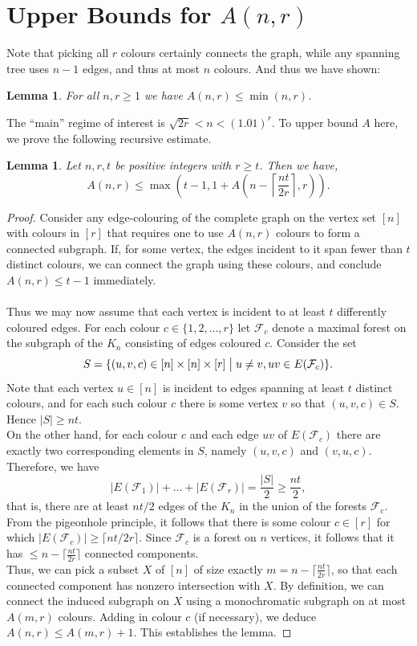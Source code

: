 \documentclass[11pt,a4paper]{article}
\newtheorem{lemma}[theorem]{Lemma}
\begin{document}
\section{Upper Bounds for \texorpdfstring{$A(n, r)$}{A(n, r)}}
Note that picking all $r$ colours certainly connects the graph, while any spanning tree uses $n-1$ edges, and thus at most $n$ colours. And thus we have shown:
\begin{lemma}
\label{lem:2:1}
For all $n, r \geq 1$ we have $A(n, r) \leq \min(n, r)$.
\end{lemma}
\noindent The ``main'' regime of interest is $\sqrt{2r} < n < (1.01)^r$. To upper bound $A$ here, we prove the following recursive estimate.
\begin{lemma}
\label{lem:2:2}
Let $n, r, t$ be positive integers with $r \geq t$. Then we have, \[A(n, r) \leq \max \left(t-1, 1 + A \left(n - \left\lceil\frac{nt}{2r}\right\rceil, r\right) \right). \]
\end{lemma}
\begin{proof}
Consider any edge-colouring of the complete graph on the vertex set $[n]$ with colours in $[r]$ that requires one to use $A(n, r)$ colours to form a connected subgraph.
If, for some vertex, the edges incident to it span fewer than $t$ distinct colours, we can connect the graph using these colours, and conclude $A(n, r) \leq t-1$ immediately. \\\\
Thus we may now assume that each vertex is incident to at least $t$ differently coloured edges. For each colour $c \in \{1, 2, \dots, r\}$ let $\mathcal F_c$ denote a maximal forest on the subgraph of the $K_n$ consisting of edges coloured $c$. Consider the set \[S = \{(u, v, c) \in [n] \times [n] \times [r] \bigm| u \ne v, uv \in E(\mathcal F_c)\}.\]
Note that each vertex $u \in [n]$ is incident to edges spanning at least $t$ distinct colours, and for each such colour $c$ there is some vertex $v$ so that $(u, v, c) \in S$. Hence $|S| \geq nt$. \\

\noindent
On the other hand, for each colour $c$ and each edge 
$uv$ of $E(\mathcal F_c)$ there are exactly two corresponding elements in $S$, namely $(u, v, c)$ and $(v, u, c)$. Therefore, we have
\[|E(\mathcal F_1)| + \dots + |E(\mathcal F_r)| = \frac{|S|}{2} \geq \frac{nt}{2},\]
that is, there are at least $nt/2$ edges of the $K_n$ in the union of the forests $\mathcal F_c$. From the pigeonhole principle, it follows that there is some colour $c \in [r]$ for which $|E(\mathcal F_c)| \geq \lceil nt/2r \rceil$. Since $\mathcal F_c$ is a forest on $n$ vertices, it follows that it has $\leq n - \lceil \frac{nt}{2r} \rceil$ connected components. \\

\noindent
Thus, we can pick a subset $X$ of $[n]$ of size exactly $m =n - \lceil \frac{nt}{2r} \rceil$, so that each connected component has nonzero intersection with $X$. By definition, we can connect the induced subgraph on $X$ using a monochromatic subgraph on at most $A(m, r)$ colours. Adding in colour $c$ (if necessary), we deduce $A(n, r) \leq A(m, r)+1$. This establishes the lemma.
\end{proof}
\end{document}
